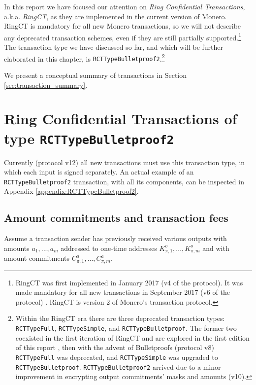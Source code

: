 In this report we have focused our attention on {\em Ring Confidential Transactions}, a.k.a. {\em RingCT}, as they are implemented in the current version of Monero. RingCT is mandatory for all new Monero transactions, so we will not describe any deprecated transaction schemes, even if they are still partially supported.\footnote{RingCT was first implemented in January 2017 (v4 of the protocol). It was made mandatory for all new transactions in September 2017 (v6 of the protocol) \cite{ringct-dates}. RingCT is version 2 of Monero's transaction protocol.} The transaction type we have discussed so far, and which will be further elaborated in this chapter, is {\tt RCTTypeBulletproof2}.\footnote{Within the RingCT era there are three deprecated transaction types: {\tt RCTTypeFull}, {\tt RCTTypeSimple}, and {\tt RCTTypeBulletproof}. The former two coexisted in the first iteration of RingCT and are explored in the first edition of this report \cite{ztm-1}, then with the advent of Bulletproofs (protocol v8) {\tt RCTTypeFull} was deprecated, and {\tt RCTTypeSimple} was upgraded to {\tt RCTTypeBulletproof}. {\tt RCTTypeBulletproof2} arrived due to a minor improvement in encrypting output commitments' masks and amounts (v10).}

We present a conceptual summary of transactions in Section \ref{sec:transaction_summary}.



\section{Ring Confidential Transactions of type {\tt RCTTypeBulletproof2}}
\label{sec:RCTTypeBulletproof2}

Currently (protocol v12) all new transactions must use this transaction type, in which each input is signed separately. An actual example of an {\tt RCTTypeBulletproof2} transaction, with all its components, can be inspected in Appendix \ref{appendix:RCTTypeBulletproof2}.


\subsection{Amount commitments and transaction fees}
\label{sec:commitments-and-fees}

Assume a transaction sender has previously received various outputs with amounts $a_1, ..., a_m$ addressed to one-time addresses $K^o_{\pi,1}, ..., K^o_{\pi,m}$ and with amount commitments $C^a_{\pi,1}, ..., C^a_{\pi,m}$.

